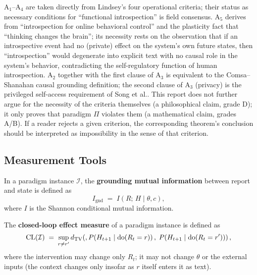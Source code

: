 \begin{remark}
$\mathrm{A}_1$--$\mathrm{A}_4$ are taken directly from Lindsey's four operational
criteria\cite{lindsey-2026-introspection}; their status as necessary conditions for
``functional introspection'' is field consensus. $\mathrm{A}_5$ derives from ``introspection for
online behavioral control''\cite{kammerer-frankish-2023} and the plasticity fact that
``thinking changes the brain''\cite{dayan-abbott-2001}; its necessity rests on the observation
that if an introspective event had no (private) effect on the system's own future states,
then ``introspection'' would degenerate into explicit text with no causal role in the system's
behavior, contradicting the self-regulatory function of human introspection. $\mathrm{A}_2$
together with the first clause of $\mathrm{A}_3$ is equivalent to the Comsa--Shanahan causal
grounding definition\cite{comsa-shanahan-2025}; the second clause of $\mathrm{A}_3$
(privacy) is the privileged self-access requirement of Song et
al.\cite{song-privileged-2025}.
This report does not further argue for the necessity of the criteria themselves (a
philosophical claim, grade D); it only proves that paradigm $\Pi$ violates them (a
mathematical claim, grades A/B). If a reader rejects a given criterion, the corresponding
theorem's conclusion should be interpreted as impossibility in the sense of that criterion.
\end{remark}

\subsection{Measurement Tools}

\begin{definition}\label{def:gmi}
In a paradigm instance $\mathcal{I}$, the \textbf{grounding mutual information} between report
and state is defined as
\begin{equation}
I_{\mathrm{gnd}} \;=\; I\!\left(R;\, H \mid \theta, c\right),
\label{eq:gmi}
\end{equation}
where $I$ is the Shannon conditional mutual information\cite{shannon-1948, cover-thomas-2006}.
\end{definition}

\begin{definition}\label{def:cl}
The \textbf{closed-loop effect measure} of a paradigm instance is defined as
\begin{equation}
\mathrm{CL}(\mathcal{I}) \;=\; \sup_{r \ne r'} d_{\mathrm{TV}}\!\left(,P\!\left(H_{t+1} \mid \operatorname{do}(R_t = r)\right),\;
P\!\left(H_{t+1} \mid \operatorname{do}(R_t = r')\right)\right),
\label{eq:cl}
\end{equation}
where the intervention may change only $R_t$; it may not change $\theta$ or the external
inputs (the context changes only insofar as $r$ itself enters it as text).
\end{definition}

